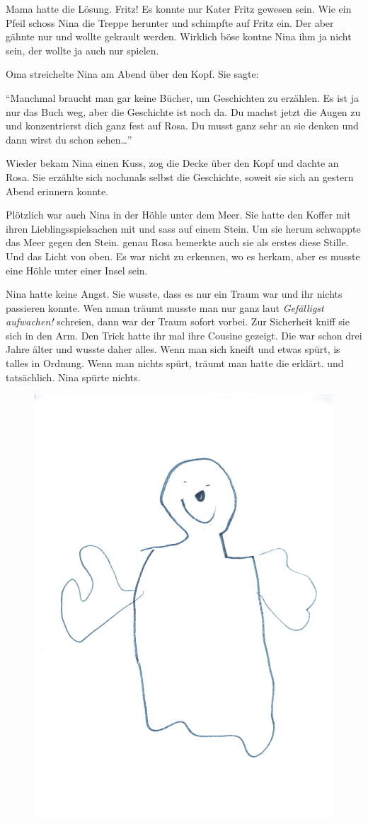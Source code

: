\begin{mdframed}[style=mystyle]
Mama hatte die Lösung. Fritz! Es konnte nur Kater Fritz gewesen sein. Wie ein Pfeil schoss Nina die Treppe herunter und schimpfte auf Fritz ein. Der aber gähnte nur und wollte gekrault werden. Wirklich böse kontne Nina ihm ja nicht sein, der wollte ja auch nur spielen.

Oma streichelte Nina am Abend über den Kopf. Sie sagte:

\enquote{Manchmal braucht man gar keine Bücher, um Geschichten zu erzählen. Es ist ja nur das Buch weg, aber die Geschichte ist noch da. Du machst jetzt die Augen zu und konzentrierst dich ganz fest auf Rosa. Du musst ganz sehr an sie denken und dann wirst du schon sehen\dots}

Wieder bekam Nina einen Kuss, zog die Decke über den Kopf und dachte an Rosa. Sie erzählte sich nochmals selbst die Geschichte, soweit sie sich an gestern Abend erinnern konnte.
\end{mdframed}\medskip

Plötzlich war auch Nina in der Höhle unter dem Meer. Sie hatte den Koffer mit ihren Lieblingsspielsachen mit und sass auf einem Stein. Um sie herum schwappte das Meer gegen den Stein. genau Rosa bemerkte auch sie als erstes diese Stille. Und das Licht von oben. Es war nicht zu erkennen, wo es herkam, aber es musste eine Höhle unter einer Insel sein.

Nina hatte keine Angst. Sie wusste, dass es nur ein Traum war und ihr nichts passieren konnte. Wen nman träumt musste man nur ganz laut {\it Gefälligst aufwachen!} schreien, dann war der Traum sofort vorbei. Zur Sicherheit kniff sie sich in den Arm. Den Trick hatte ihr mal ihre Cousine gezeigt. Die war schon drei Jahre älter und wusste daher alles. Wenn man sich kneift und etwas spürt, is talles in Ordnung. Wenn man nichts spürt, träumt man hatte die erklärt. und tatsächlich. Nina spürte nichts.






\begin{figure}[hb]
\centering
\includegraphics[width=.7\textwidth]{bilder/gespenst1.pdf}
\end{figure}

\begin{mdframed}[style=mystyle]
\end{mdframed}\medskip
